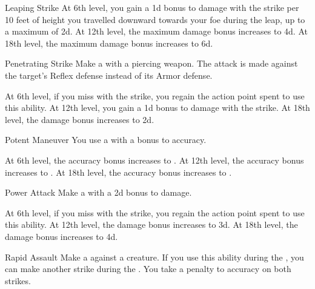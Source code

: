 {\begin{ability}{Leaping Strike}
                At 6th level, you gain a \plus1d bonus to damage with the strike per 10 feet of height you travelled downward towards your foe during the leap, up to a maximum of \plus2d.
                At 12th level, the maximum damage bonus increases to \plus4d.
                At 18th level, the maximum damage bonus increases to \plus6d.
            \end{ability}

            \begin{ability}{Penetrating Strike}
                Make a  with a piercing weapon.
                The attack is made against the target's Reflex defense instead of its Armor defense.

                At 6th level, if you miss with the strike, you regain the action point spent to use this ability.
                At 12th level, you gain a \plus1d bonus to damage with the strike.
                At 18th level, the damage bonus increases to \plus2d.
            \end{ability}

            \begin{ability}{Potent Maneuver}
                You use a  with a  bonus to accuracy.

                At 6th level, the accuracy bonus increases to .
                At 12th level, the accuracy bonus increases to .
                At 18th level, the accuracy bonus increases to .
            \end{ability}

            \begin{ability}{Power Attack}
                Make a  with a \plus2d bonus to damage.

                At 6th level, if you miss with the strike, you regain the action point spent to use this ability.
                At 12th level, the damage bonus increases to \plus3d.
                At 18th level, the damage bonus increases to \plus4d.
            \end{ability}

            \begin{ability}{Rapid Assault}
                Make a  against a creature.
                If you use this ability during the , you can make another strike during the .
                You take a  penalty to accuracy on both strikes.


\end{ability}}

